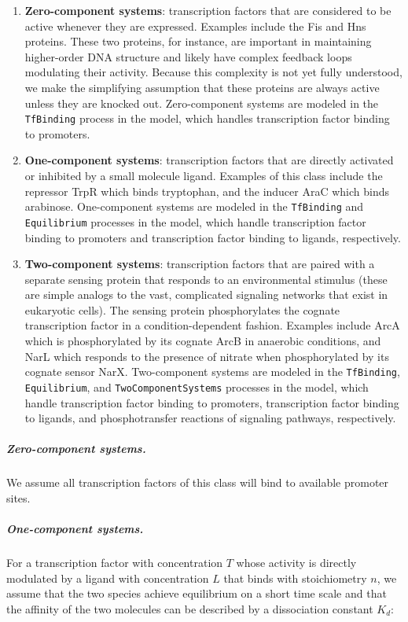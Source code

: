 \documentclass[12pt]{article}
\begin{document}
\begin{enumerate}
\item \textbf{Zero-component systems}: transcription factors that are considered to be active whenever they are expressed.  Examples include the Fis and Hns proteins.  These two proteins, for instance, are important in maintaining higher-order DNA structure and likely have complex feedback loops modulating their activity.  Because this complexity is not yet fully understood, we make the simplifying assumption that these proteins are always active unless they are knocked out. Zero-component systems are modeled in the \texttt{TfBinding} process in the model, which handles transcription factor binding to promoters.

\item \textbf{One-component systems}: transcription factors that are directly activated or inhibited by a small molecule ligand.  Examples of this class include the repressor TrpR which binds tryptophan, and the inducer AraC which binds arabinose. One-component systems are modeled in the \texttt{TfBinding} and \texttt{Equilibrium} processes in the model, which handle transcription factor binding to promoters and transcription factor binding to ligands, respectively.

\item \textbf{Two-component systems}: transcription factors that are paired with a separate sensing protein that responds to an environmental stimulus (these are simple analogs to the vast, complicated signaling networks that exist in eukaryotic cells).  The sensing protein phosphorylates the cognate transcription factor in a condition-dependent fashion.  Examples include ArcA which is phosphorylated by its cognate ArcB in anaerobic conditions, and NarL which responds to the presence of nitrate when phosphorylated by its cognate sensor NarX. Two-component systems are modeled in the \texttt{TfBinding}, \texttt{Equilibrium}, and \texttt{TwoComponentSystems} processes in the model, which handle transcription factor binding to promoters, transcription factor binding to ligands, and phosphotransfer reactions of signaling pathways, respectively.
\end{enumerate}

\subparagraph{Zero-component systems.}
We assume all transcription factors of this class will bind to available promoter sites.

\subparagraph{One-component systems.}
For a transcription factor with concentration \(T\) whose activity is directly modulated by a ligand with concentration \(L\) that binds with stoichiometry \(n\), we assume that the two species achieve equilibrium on a short time scale and that the affinity of the two molecules can be described by a dissociation constant \(K_d\):
\end{document}
